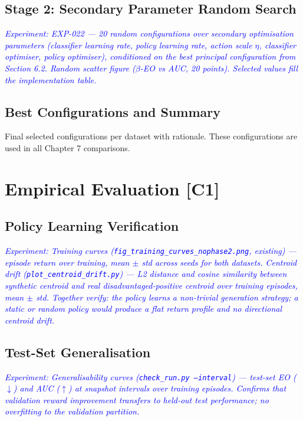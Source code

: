 \documentclass[12pt]{article}
\newcommand{\experiment}[1]{\textcolor{blue}{\textit{Experiment: #1}}}
\newcommand{\contrib}[1]{\textbf{[#1]}}
\begin{document}
\subsection{Stage 2: Secondary Parameter Random Search}
\experiment{EXP-022 --- 20 random configurations over secondary optimisation
parameters (classifier learning rate, policy learning rate, action scale
$\eta$, classifier optimiser, policy optimiser), conditioned on the best
principal configuration from Section 6.2. Random scatter figure ($\beta$-EO
vs AUC, 20 points). Selected values fill the implementation table.}

\subsection{Best Configurations and Summary}
Final selected configurations per dataset with rationale. These configurations
are used in all Chapter 7 comparisons.

\section{Empirical Evaluation \contrib{C1}}

\subsection{Policy Learning Verification}
\experiment{Training curves (\texttt{fig\_training\_curves\_nophase2.png},
existing) --- episode return over training, mean $\pm$ std across seeds for
both datasets. Centroid drift (\texttt{plot\_centroid\_drift.py}) --- L2
distance and cosine similarity between synthetic centroid and real
disadvantaged-positive centroid over training episodes, mean $\pm$ std.
Together verify: the policy learns a non-trivial generation strategy; a static
or random policy would produce a flat return profile and no directional
centroid drift.}

\subsection{Test-Set Generalisation}
\experiment{Generalisability curves (\texttt{check\_run.py --interval}) ---
test-set EO ($\downarrow$) and AUC ($\uparrow$) at snapshot intervals over
training episodes. Confirms that validation reward improvement transfers to
held-out test performance; no overfitting to the validation partition.}
\end{document}
